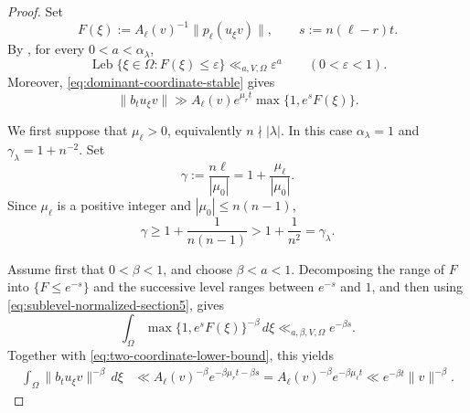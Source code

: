 \documentclass[reqno,11pt]{amsart}
\numberwithin{equation}{section}
\theoremstyle{definition}
\theoremstyle{remark}
\newcommand{\op}{\operatorname}
\newcommand{\Leb}{\op{Leb}}
\begin{document}
\begin{proof}
Set
$$
F(\xi):=A_\ell(v)^{-1} {\|p_\ell(u_\xi v)\|},
\qquad
s:=n(\ell-r)t.
$$
By , for every
$0<a<\alpha_\lambda$,
\begin{equation}
\label{eq:sublevel-normalized-section5}
\Leb\{\xi\in\Omega:F(\xi)\le\varepsilon\}
\ll_{a,V,\Omega}\varepsilon^a
\qquad(0<\varepsilon<1).
\end{equation}
Moreover, \eqref{eq:dominant-coordinate-stable} gives
\begin{equation}
\label{eq:two-coordinate-lower-bound}
\|b_tu_\xi v\|
\gg A_\ell(v)e^{\mu_rt}\max\{1,e^sF(\xi)\}.
\end{equation}

We first suppose that $\mu_\ell>0$, equivalently
$n\nmid|\lambda|$. In this case $\alpha_\lambda=1$ and
$\gamma_\lambda=1+n^{-2}$. Set
$$
\gamma:=\frac{n\ell}{|\mu_0|}
=1+\frac{\mu_\ell}{|\mu_0|}.
$$
Since $\mu_\ell$ is a positive integer and
$|\mu_0|\le n(n-1)$,
$$
\gamma\ge1+\frac1{n(n-1)}
>1+\frac1{n^2}
=\gamma_\lambda.
$$

Assume first that $0<\beta<1$, and choose
$\beta<a<1$. Decomposing the range of $F$ into
$\{F\le e^{-s}\}$ and the successive level ranges between $e^{-s}$
and $1$, and then using
\eqref{eq:sublevel-normalized-section5}, gives
$$
\int_\Omega\max\{1,e^sF(\xi)\}^{-\beta}\,d\xi
\ll_{a,\beta,V,\Omega}e^{-\beta s}.
$$
Together with \eqref{eq:two-coordinate-lower-bound}, this yields
$$
\begin{aligned}
\int_\Omega\|b_tu_\xi v\|^{-\beta}\,d\xi
&\ll A_\ell(v)^{-\beta}e^{-\beta\mu_rt-\beta s}=A_\ell(v)^{-\beta}e^{-\beta\mu_\ell t}
\ll e^{-\beta t}\|v\|^{-\beta}.
\end{aligned}
$$


\end{proof}
\end{document}
